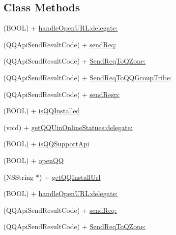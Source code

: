 \subsection*{Class Methods}
\begin{DoxyCompactItemize}
\item 
(B\+O\+OL) + \mbox{\hyperlink{interface_q_q_api_interface_abb9f4ae5999f13ee71aece0f58043b84}{handle\+Open\+U\+R\+L\+:delegate\+:}}
\item 
(Q\+Q\+Api\+Send\+Result\+Code) + \mbox{\hyperlink{interface_q_q_api_interface_aa7563c172cd93277d97cf21ec6755614}{send\+Req\+:}}
\item 
(Q\+Q\+Api\+Send\+Result\+Code) + \mbox{\hyperlink{interface_q_q_api_interface_a81c51681c6188b60829f9200fe3d2368}{Send\+Req\+To\+Q\+Zone\+:}}
\item 
(Q\+Q\+Api\+Send\+Result\+Code) + \mbox{\hyperlink{interface_q_q_api_interface_a7f4a0e2ff82a3d9ca0ccb8a28ed68dd6}{Send\+Req\+To\+Q\+Q\+Group\+Tribe\+:}}
\item 
(Q\+Q\+Api\+Send\+Result\+Code) + \mbox{\hyperlink{interface_q_q_api_interface_aac1f1046d586eadaebc8d21b2b8041cd}{send\+Resp\+:}}
\item 
(B\+O\+OL) + \mbox{\hyperlink{interface_q_q_api_interface_a3cce7811084fbe0fac86a61068a5bb8f}{is\+Q\+Q\+Installed}}
\item 
(void) + \mbox{\hyperlink{interface_q_q_api_interface_ae77e4e9dd1328f58048144afe625cfbf}{get\+Q\+Q\+Uin\+Online\+Statues\+:delegate\+:}}
\item 
(B\+O\+OL) + \mbox{\hyperlink{interface_q_q_api_interface_a3669fca9c3a1df5991416dc3a5a719c4}{is\+Q\+Q\+Support\+Api}}
\item 
(B\+O\+OL) + \mbox{\hyperlink{interface_q_q_api_interface_a3464302bc808ef7b69f82129820f0696}{open\+QQ}}
\item 
(N\+S\+String $\ast$) + \mbox{\hyperlink{interface_q_q_api_interface_a6cbc694efeaefe36335c9ac89e575ff4}{get\+Q\+Q\+Install\+Url}}
\item 
(B\+O\+OL) + \mbox{\hyperlink{interface_q_q_api_interface_abb9f4ae5999f13ee71aece0f58043b84}{handle\+Open\+U\+R\+L\+:delegate\+:}}
\item 
(Q\+Q\+Api\+Send\+Result\+Code) + \mbox{\hyperlink{interface_q_q_api_interface_aa7563c172cd93277d97cf21ec6755614}{send\+Req\+:}}
\item 
(Q\+Q\+Api\+Send\+Result\+Code) + \mbox{\hyperlink{interface_q_q_api_interface_a81c51681c6188b60829f9200fe3d2368}{Send\+Req\+To\+Q\+Zone\+:}}
\item 

\end{DoxyCompactItemize}
